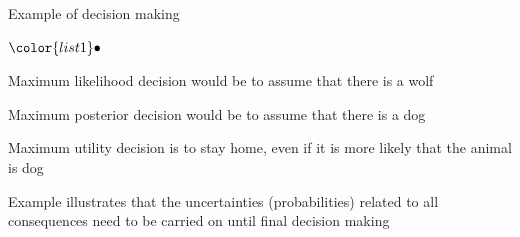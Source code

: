 \documentclass[t]{beamer}
\newenvironment{list1}{
   \begin{list}{$\color{list1}\bullet$}{\itemsep=6pt}}{
  \end{list}}
\newenvironment{list2}{
  \begin{list}{-}{\baselineskip=12pt\itemsep=2pt}}{
  \end{list}}
\begin{document}
\begin{frame}{Example of decision making}

  \begin{list1}
  \item<+-> Maximum likelihood decision would be to assume that there is a wolf
  \item<+-> Maximum posterior decision would be to assume that there is a dog
  \item<+-> Maximum utility decision is to stay home, even if it is more likely that the animal is dog
  \item<+-> Example illustrates that the uncertainties (probabilities)
    related to all consequences need to be carried on until final
    decision making
  \end{list1}

\end{frame}





\end{document}
